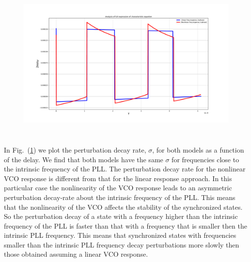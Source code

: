 \documentclass{article}
\begin{document}
\begin{figure}[!h]
	\centering
	\includegraphics[width=17cm,height=8cm]{Sigma_tau_3rdGen_linear_vs_Nonlinear_Freq_Response_pic1.pdf}	
	\caption{ }
	\label{fig:2}
\end{figure}


In Fig.~(\ref{fig:2}) we plot the perturbation decay rate, $\sigma$, for both models as a function of the delay. 
%
We find that both models have the same $\sigma$ for frequencies close to the intrinsic frequency of the PLL. 
%
The perturbation decay rate for the nonlinear VCO response is different from that for the linear response approach.
%
In this particular case the nonlinearity of the VCO response leads to an asymmetric perturbation decay-rate about the intrinsic frequency of the PLL.
%
This means that the nonlinearity of the VCO affects the stability of the synchronized states. 
%
So the perturbation decay of a state with a frequency higher than the intrinsic frequency of the PLL is faster than that with a frequency that is smaller then the intrinsic PLL frequency. 
%
This means that synchronized states with frequencies smaller than the intrinsic PLL frequency decay perturbations more slowly then those obtained assuming a linear VCO response.
\end{document}
